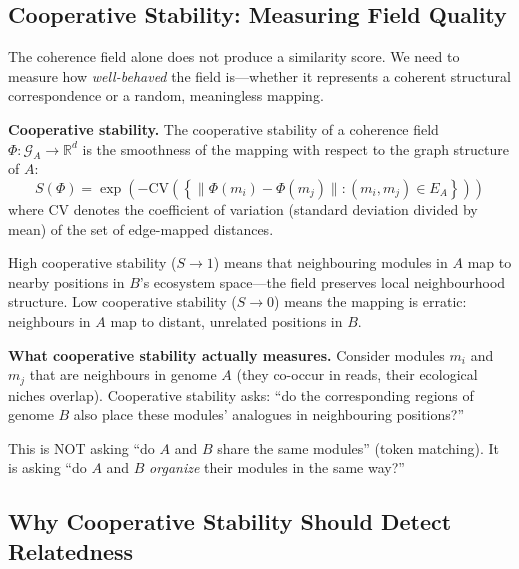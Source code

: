\documentclass{../yalumba}
\begin{document}
\subsection{Cooperative Stability: Measuring Field Quality}
\label{sec:framework:stability}

The coherence field alone does not produce a similarity score.  We need
to measure how \emph{well-behaved} the field is---whether it represents
a coherent structural correspondence or a random, meaningless mapping.

\begin{definition}
\textbf{Cooperative stability.}  The cooperative stability of a coherence
field $\Phi: \mathcal{G}_A \to \mathbb{R}^d$ is the smoothness of the
mapping with respect to the graph structure of $A$:
\begin{equation}
  S(\Phi) = \exp\!\left(-\mathrm{CV}\!\left(\left\{
    \|\Phi(m_i) - \Phi(m_j)\| : (m_i, m_j) \in E_A
  \right\}\right)\right)
  \label{eq:coop_stability}
\end{equation}
where $\mathrm{CV}$ denotes the coefficient of variation (standard
deviation divided by mean) of the set of edge-mapped distances.
\end{definition}

High cooperative stability ($S \to 1$) means that neighbouring modules
in $A$ map to nearby positions in $B$'s ecosystem space---the field
preserves local neighbourhood structure.  Low cooperative stability
($S \to 0$) means the mapping is erratic: neighbours in $A$ map to
distant, unrelated positions in $B$.

\begin{keyfinding}
\textbf{What cooperative stability actually measures.}
Consider modules $m_i$ and $m_j$ that are neighbours in genome $A$
(they co-occur in reads, their ecological niches overlap).  Cooperative
stability asks: ``do the corresponding regions of genome $B$ also
place these modules' analogues in neighbouring positions?''

This is NOT asking ``do $A$ and $B$ share the same modules'' (token
matching).  It is asking ``do $A$ and $B$ \emph{organize} their modules
in the same way?''
\end{keyfinding}

\subsection{Why Cooperative Stability Should Detect Relatedness}
\label{sec:framework:why}
\end{document}
